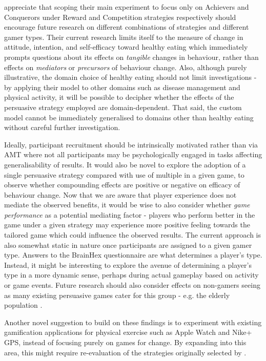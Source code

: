 \documentclass[11pt]{article}
\begin{document}
\citeauthor{orji2017} appreciate that scoping their main experiment to focus only on Achievers and Conquerors under Reward and Competition strategies respectively should encourage future research on different combinations of strategies and different gamer types. Their current research limits itself to the measure of change in attitude, intention, and self-efficacy toward healthy eating which immediately prompts questions about its effects on \textit{tangible} changes in behaviour, rather than effects on \textit{mediators} or \textit{precursors} of behaviour change. Also, although purely illustrative, the domain choice of healthy eating should not limit investigations - by applying their model to other domains such as disease management and physical activity, it will be possible to decipher whether the effects of the persuasive strategy employed are domain-dependent. That said, the custom model cannot be immediately generalised to domains other than healthy eating without careful further investigation.

Ideally, participant recruitment should be intrinsically motivated rather than via AMT where not all participants may be psychologically engaged in tasks affecting generalisability of results. It would also be novel to explore the adoption of a single persuasive strategy compared with use of multiple in a given game, to observe whether compounding effects are positive or negative on efficacy of behaviour change. Now that we are aware that player experience does not mediate the observed benefits, it would be wise to also consider whether \textit{game performance} as a potential mediating factor - players who perform better in the game under a given strategy may experience more positive feeling towards the tailored game which could influence the observed results. The current approach is also somewhat static in nature once participants are assigned to a given gamer type. Answers to the BrainHex questionnaire are what determines a player's type. Instead, it might be interesting to explore the avenue of determining a player's type in a more dynamic sense, perhaps during actual gameplay based on activity or game events. Future research should also consider effects on non-gamers seeing as many existing persuasive games cater for this group - e.g. the elderly population \citep{deoliveira2010}.

Another novel suggestion to build on these findings is to experiment with existing gamification applications for physical exercise such as Apple Watch and Nike+ GPS, instead of focusing purely on games for change. By expanding into this area, this might require re-evaluation of the strategies originally selected by \citet{gerling2014}.
\end{document}
